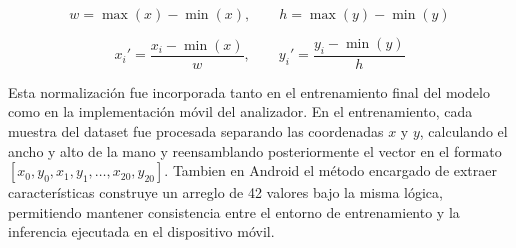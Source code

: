 	\[
	w = \max(x) - \min(x), \qquad h = \max(y) - \min(y)
	\]
	
	\[
	x_i' = \frac{x_i - \min(x)}{w}, \qquad y_i' = \frac{y_i - \min(y)}{h}
	\]
	
	Esta normalización fue incorporada tanto en el entrenamiento final del modelo como en la implementación móvil del analizador. En el entrenamiento, cada muestra del dataset fue procesada separando las coordenadas \(x\) y \(y\), calculando el ancho y alto de la mano y reensamblando posteriormente el vector en el formato \([x_0,y_0,x_1,y_1,\ldots,x_{20},y_{20}]\). Tambien en Android el método encargado de extraer características construye un arreglo de 42 valores bajo la misma lógica, permitiendo mantener consistencia entre el entorno de entrenamiento y la inferencia ejecutada en el dispositivo móvil.
	
